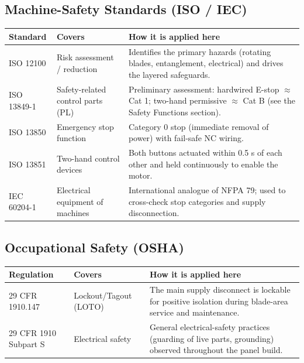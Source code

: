\documentclass[hidelinks,12pt]{article}
\begin{document}
\subsection{Machine-Safety Standards (ISO / IEC)}
\renewcommand{\arraystretch}{1.3}
\noindent\begin{tabularx}{\textwidth}{|p{2.5cm}|p{3.0cm}|X|}
\hline
\rowcolor{PSUgreen!12}\textbf{Standard} & \textbf{Covers} & \textbf{How it is applied here} \\
\hline
ISO 12100 & Risk assessment / reduction & Identifies the primary hazards (rotating blades, entanglement, electrical) and drives the layered safeguards. \\ \hline
ISO 13849-1 & Safety-related control parts (PL) & Preliminary assessment: hardwired E-stop $\approx$ Cat 1; two-hand permissive $\approx$ Cat B (see the Safety Functions section). \\ \hline
ISO 13850 & Emergency stop function & Category 0 stop (immediate removal of power) with fail-safe NC wiring. \\ \hline
ISO 13851 & Two-hand control devices & Both buttons actuated within 0.5 s of each other and held continuously to enable the motor. \\ \hline
IEC 60204-1 & Electrical equipment of machines & International analogue of NFPA 79; used to cross-check stop categories and supply disconnection. \\
\hline
\end{tabularx}
\renewcommand{\arraystretch}{1.0}

\subsection{Occupational Safety (OSHA)}
\renewcommand{\arraystretch}{1.3}
\noindent\begin{tabularx}{\textwidth}{|p{2.5cm}|p{3.0cm}|X|}
\hline
\rowcolor{PSUgreen!12}\textbf{Regulation} & \textbf{Covers} & \textbf{How it is applied here} \\
\hline
29 CFR 1910.147 & Lockout/Tagout (LOTO) & The main supply disconnect is lockable for positive isolation during blade-area service and maintenance. \\ \hline
29 CFR 1910 Subpart S & Electrical safety & General electrical-safety practices (guarding of live parts, grounding) observed throughout the panel build. \\
\hline
\end{tabularx}
\renewcommand{\arraystretch}{1.0}
\end{document}
